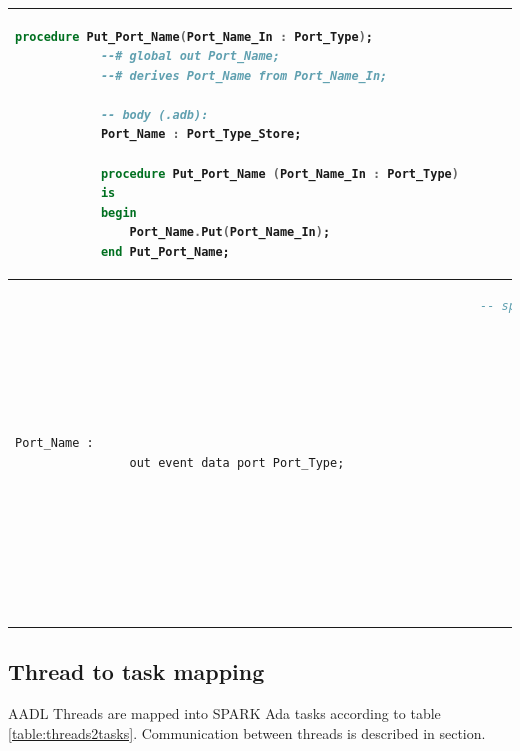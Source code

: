 \begin{center}
\begin{longtable}{| p{2in} | p{4in} |}
\begin{lstlisting}[language=ada]
			procedure Put_Port_Name(Port_Name_In : Port_Type);
			--# global out Port_Name;
			--# derives Port_Name from Port_Name_In;

			-- body (.adb):
			Port_Name : Port_Type_Store;

			procedure Put_Port_Name (Port_Name_In : Port_Type) 
			is
			begin
				Port_Name.Put(Port_Name_In);
			end Put_Port_Name;
		\end{lstlisting} 

		\\ \hline

		\begin{lstlisting}[language=aadl]
			Port_Name : 
				out event data port Port_Type;
		\end{lstlisting} 
		&
		\begin{lstlisting}[language=ada]
			-- spec (.ads)
			--# own protected Port_Name : Port_Type_Store(Priority => 10);
			
			procedure Send_Port_Name;
    		--# global in Port_Name;

			-- body (.adb):
			Port_Name : Port_Type_Store;

			procedure Send_Port_Name 
			is
			begin
				-- TODO: implement receiving Port_Name value
				-- e.g.:
				-- Some_Pkg.Put_Port_Name(Port_Name);
			end Send_Port_Name;
		\end{lstlisting} 
	\end{longtable}
\end{center}
\doublespacing


\subsection{Thread to task mapping}
\label{codegen:mapping:threads}

AADL Threads are mapped into SPARK Ada tasks according to table \ref{table:threads2tasks}. Communication between threads is described in section.

